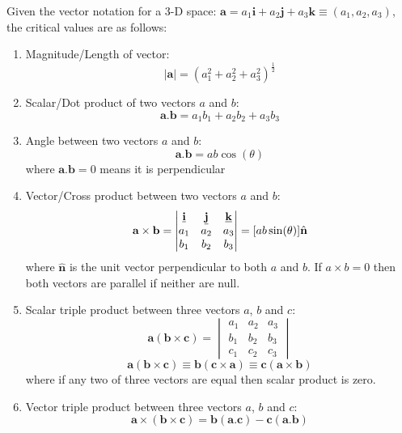 \documentclass[10pt,a4paper]{article}
\begin{document}
Given the vector notation for a 3-D space: $\textbf{a}=a_1 \textbf{i}+a_2 \textbf{j}+a_3 \textbf{k}
\equiv (a_1,a_2,a_3)$, the critical values are as follows:
\begin{enumerate}
    \item Magnitude/Length of vector:
    $$
        |\textbf{a}| = (a_1^2+a_2^2+a_3^2)^{\frac{1}{2}}
    $$

    \item Scalar/Dot product of two vectors $a$ and $b$:
    $$
        \textbf{a}.\textbf{b}=a_1b_1 + a_2b_2 + a_3b_3
    $$

    \item Angle between two vectors $a$ and $b$:
    $$
        \textbf{a}.\textbf{b}=ab\cos(\theta)
    $$
    where $\textbf{a}.\textbf{b}=0$ means it is perpendicular

    \item Vector/Cross product between two vectors $a$ and $b$:
    $$
    \textbf{a}\times \textbf{b} = 
    \begin{vmatrix}
        \textbf{\underline{i}} & \textbf{\underline{j}} & \textbf{\underline{k}} \\
        a_1 & a_2 & a_3 \\
        b_1 & b_2 & b_3
    \end{vmatrix} = [ab\sin(\theta)]\hat{\textbf{n}}
    $$
    where $\hat{\textbf{n}}$ is the unit vector perpendicular to both $a$ and $b$. If $a\times b =
    0$ then both vectors are parallel if neither are null.

    \item Scalar triple product between three vectors $a$, $b$ and $c$:
    $$
    \textbf{a}(\textbf{b} \times \textbf{c}) = 
    \begin{vmatrix}
        a_1 & a_2 & a_3 \\
        b_1 & b_2 & b_3 \\
        c_1 & c_2 & c_3 
    \end{vmatrix}
    $$
    $$
        \textbf{a}(\textbf{b} \times \textbf{c}) \equiv \textbf{b}(\textbf{c} \times \textbf{a}) \equiv \textbf{c}(\textbf{a} \times \textbf{b})
    $$
    where if any two of three vectors are equal then scalar product is zero.

    \item Vector triple product between three vectors $a$, $b$ and $c$:
    $$
        \textbf{a}\times (\textbf{b} \times \textbf{c}) = \textbf{b}(\textbf{a}.\textbf{c}) - \textbf{c}(\textbf{a} . \textbf{b})
    $$
\end{enumerate}
\end{document}
